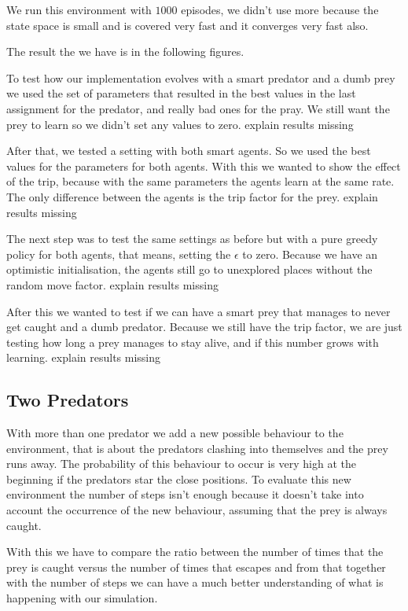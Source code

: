 \documentclass{article}
\begin{document}
We run this environment with $1000$ episodes, we didn't use more because the
state space is small and is covered very fast and it converges very fast also.

The result the we have is in the following figures.

To test how our implementation evolves with a smart predator and a dumb prey we
used the set of parameters that resulted in the best values in the last
assignment for the predator, and really bad ones for the pray. We still want the
prey to learn so we didn't set any values to zero.
\error explain results missing



After that, we tested a setting with both smart agents. So we used the best
values for the parameters for both agents. With this we wanted to show the effect
of the trip, because with the same parameters the agents learn at the same rate.
The only difference between the agents is the trip factor for the prey.
\error explain results missing

The next step was to test the same settings as before but with a pure greedy
policy for both agents, that means, setting the $\epsilon$ to zero. Because we
have an optimistic initialisation, the agents still go to unexplored places
without the random move factor.
\error explain results missing

After this we wanted to test if we can have a smart prey that manages to never
get caught and a dumb predator. Because we still have the trip
factor, we are just testing how long a prey manages to stay alive, and if this
number grows with learning.
\error explain results missing


\subsection{Two Predators}
\label{twoP}
With more than one predator we add a new possible behaviour to the environment,
that is about the predators clashing into themselves and the prey runs away. The
probability of this behaviour to occur is very high at the beginning if the
predators star the close positions. To evaluate this new environment the number
of steps isn't enough because it doesn't take into account the occurrence of the
new behaviour, assuming that the prey is always caught. 

With this we have to compare the ratio between the number of times that the prey
is caught versus the number of times that escapes and from that together
with the number of steps we can have a much better understanding of what is
happening with our simulation.
\end{document}
